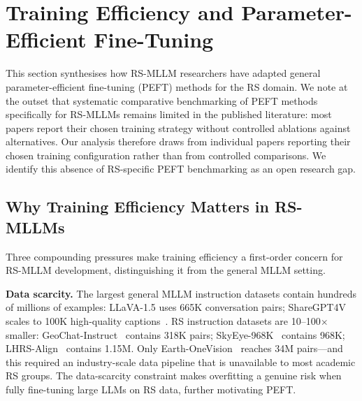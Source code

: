 
\section{Training Efficiency and Parameter-Efficient Fine-Tuning}\label{sec6}

This section synthesises how RS-MLLM researchers have adapted general
parameter-efficient fine-tuning (PEFT) methods for the RS domain. We note at
the outset that systematic comparative benchmarking of PEFT methods specifically
for RS-MLLMs remains limited in the published literature: most papers report
their chosen training strategy without controlled ablations against alternatives.
Our analysis therefore draws from individual papers reporting their chosen
training configuration rather than from controlled comparisons. We identify this
absence of RS-specific PEFT benchmarking as an open research gap.

\subsection{Why Training Efficiency Matters in RS-MLLMs}\label{sec6:why}

Three compounding pressures make training efficiency a first-order concern for
RS-MLLM development, distinguishing it from the general MLLM setting.

\textbf{Data scarcity.}
The largest general MLLM instruction datasets contain hundreds of millions of
examples: LLaVA-1.5 uses 665K conversation pairs; ShareGPT4V scales to 100K
high-quality captions~\cite{llava2023,blip22023}. RS instruction datasets are
10--100$\times$ smaller: GeoChat-Instruct~\cite{geochat2024} contains 318K
pairs; SkyEye-968K~\cite{skyeyegpt2025} contains 968K; LHRS-Align~\cite{lhrsalign2024}
contains 1.15M. Only Earth-OneVision~\cite{earthonevision2026} reaches 34M
pairs---and this required an industry-scale data pipeline that is unavailable
to most academic RS groups. The data-scarcity constraint makes overfitting a
genuine risk when fully fine-tuning large LLMs on RS data, further motivating
PEFT.

